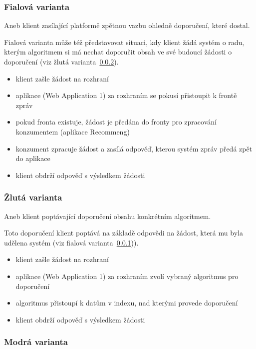 \documentclass[thesis=M,czech]{FITthesis}[2014/05/07]
\begin{document}
\subsubsection{Fialová varianta}
\label{subsub:purple}

Aneb klient zasílající platformě zpětnou vazbu ohledně doporučení, které dostal.

Fialová varianta může též představovat situaci, kdy klient žádá systém o radu, kterým algoritmem si má nechat doporučit obsah ve své budoucí žádosti o doporučení (viz žlutá varianta~\ref{subsub:yellow}).

\begin{itemize}
	\item klient zašle žádost na rozhraní
	\item aplikace (Web Application 1) za rozhraním se pokusí přistoupit k frontě zpráv
	\item pokud fronta existuje, žádost je předána do fronty pro zpracování konzumentem (aplikace Recommeng)
	\item konzument zpracuje žádost a zasílá odpověď, kterou systém zpráv předá zpět do aplikace
	\item klient obdrží odpověď s výsledkem žádosti
\end{itemize}

\subsubsection{Žlutá varianta}
\label{subsub:yellow}

Aneb klient poptávající doporučení obsahu konkrétním algoritmem.

Toto doporučení klient poptává na základě odpovědi na žádost, která mu byla udělena systém (viz fialová varianta~\ref{subsub:purple})). 

\begin{itemize}
	\item klient zašle žádost na rozhraní
	\item aplikace (Web Application 1) za rozhraním zvolí vybraný algoritmus pro doporučení
	\item algoritmus přistoupí k datům v indexu, nad kterými provede doporučení
	\item klient obdrží odpověď s výsledkem žádosti
\end{itemize}

\subsubsection{Modrá varianta}
\end{document}
